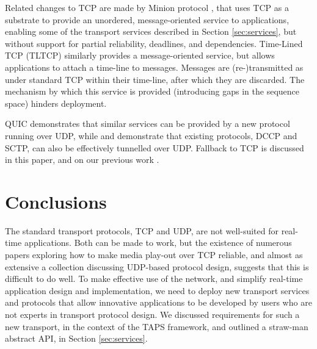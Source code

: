 \documentclass[10pt]{sig-alternate-05-2015}
\begin{document}
%
%

Related changes to TCP are made by Minion protocol \cite{nowlan:2012:minion},
that uses TCP as a substrate to provide an unordered, message-oriented
service to applications, enabling some of the transport services described
in Section \ref{sec:services}, but without support for partial reliability,
deadlines, and dependencies.
Time-Lined TCP (TLTCP) \cite{mukherjee:2000:timelines} similarly provides a
message-oriented service, but allows applications to attach a time-line
to messages. Messages are (re-)transmitted as under standard TCP within
their time-line, after which they are discarded. The mechanism by which
this service is provided (introducing gaps in the sequence space) hinders
deployment. 

QUIC \cite{draft-tsvwg-quic-protocol-02} demonstrates that similar services
can be provided by a new protocol running over UDP, while \cite{RFC6773} and
\cite{draft-ietf-rtcweb-data-channel-13} demonstrate that existing protocols,
DCCP and SCTP, can also be effectively tunnelled over UDP. Fallback to TCP
is discussed in this paper, and on our previous work \cite{mcquistin2016hollywood}.

\section{Conclusions}
\label{sec:conclusions}

The standard transport protocols, TCP and UDP, are not well-suited for
real-time applications. Both can be made to work, but the existence of
numerous papers exploring how to make media play-out over TCP reliable, 
and almost as extensive a collection discussing UDP-based protocol design,
suggests that this is difficult to do well. To make effective use of the
network, and simplify real-time application design and implementation, we
need to deploy new transport services and protocols that allow innovative
applications to be developed by users who are not experts in transport 
protocol design. We discussed requirements for such a new transport, in
the context of the TAPS framework, and outlined a straw-man abstract API,
in Section \ref{sec:services}.
\end{document}
